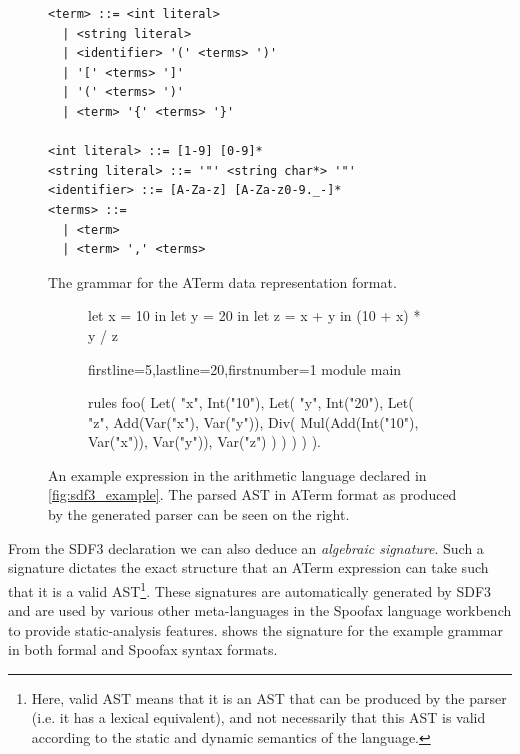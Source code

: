 
\begin{figure}
  \begin{lstlisting}
<term> ::= <int literal>
  | <string literal>
  | <identifier> '(' <terms> ')'
  | '[' <terms> ']'
  | '(' <terms> ')'
  | <term> '{' <terms> '}'

<int literal> ::= [1-9] [0-9]*
<string literal> ::= '"' <string char*> '"'
<identifier> ::= [A-Za-z] [A-Za-z0-9._-]*
<terms> ::=
  | <term>
  | <term> ',' <terms>
  \end{lstlisting}
  \caption{The grammar for the \ac{ATerm} data representation format.}
  \label{fig:aterm_grammar}
\end{figure}

\begin{figure}
  \centering
  \begin{subfigure}{.35\textwidth}
    \centering
    \begin{mat}
let x = 10 in
  let y = 20 in
    let z = x + y in
      (10 + x) * y / z
    \end{mat}
  \end{subfigure}\hfill%
  \begin{subfigure}{.585\textwidth}
    \centering
    \begin{statix*}{firstline=5,lastline=20,firstnumber=1}
module main

rules
  foo(
Let(
  "x",
  Int("10"),
  Let(
    "y",
    Int("20"),
    Let(
      "z",
      Add(Var("x"), Var("y")),
      Div(
        Mul(Add(Int("10"), Var("x")), Var("y")),
        Var("z")
      )
    )
  )
)
  ).
    \end{statix*}
  \end{subfigure}
  \caption{An example expression in the arithmetic language declared in \cref{fig:sdf3_example}\protect\footnotemark. The parsed \ac{AST} in \ac{ATerm} format as produced by the generated parser can be seen on the right.}
  \label{fig:sdf3_example_parse_output}
\end{figure}


From the SDF3 declaration we can also deduce an \textit{algebraic signature}. Such a signature dictates the exact structure that an \ac{ATerm} expression can take such that it is a valid AST\footnote{Here, valid \ac{AST} means that it is an \ac{AST} that can be produced by the parser (i.e. it has a lexical equivalent), and not necessarily that this \ac{AST} is valid according to the static and dynamic semantics of the language.}. These signatures are automatically generated by SDF3 and are used by various other meta-languages in the Spoofax language workbench to provide static-analysis features.  shows the signature for the example grammar in both formal and Spoofax syntax formats.\\

